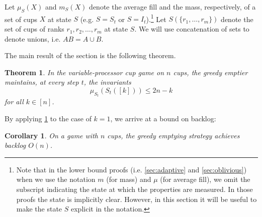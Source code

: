 \documentclass[twocolumn]{article}[10pt]
\newtheorem{corollary}{Corollary}
\newtheorem{theorem}{Theorem}
\begin{document}
Let $\mu_S(X)$ and $m_S(X)$ denote the average fill and the mass, respectively,
of a set of cups $X$ at state $S$ (e.g. $S=S_t$ or $S=I_t$).\footnote{Note that
  in the lower bound proofs (i.e. \cref{sec:adaptive} and 
  \cref{sec:oblivious}) when we use the notation $m$ (for mass) and $\mu$ (for
average fill), we omit the subscript indicating the state at which the
properties are measured. In those proofs the state is implicitly clear.
However, in this section it will be useful to make the state $S$ explicit in
the notation.} Let $S(\{r_1, \ldots, r_m\})$ denote the set of cups of ranks
$r_1, r_2, \ldots, r_m$ at state $S$. We will use concatenation of sets to
denote unions, i.e. $AB = A\cup B$. 

The main result of the section is the following theorem.  
\begin{theorem}
  \label{thm:invariant}
  In the variable-processor cup game on $n$ cups, the greedy emptier maintains, at every step $t$,
  the invariants
  \begin{equation}
    \label{eq:invariants}
      \mu_{S_t}(S_t([k])) \le 2n-k
  \end{equation}
  for all  $k \in [n]$.
\end{theorem}

By applying \cref{thm:invariant} to the case of $k = 1$, we arrive at a bound on backlog:
\begin{corollary}
  On a game with $n$ cups, the greedy emptying strategy achieves backlog $O(n)$.
  \label{cor:upperbound}
\end{corollary}
\end{document}
